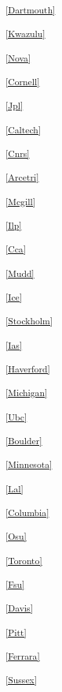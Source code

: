 \begin{multicols}{2}
\noindent
\textsuperscript{\ref{Dartmouth}}\Dartmouthtext

\noindent
\textsuperscript{\ref{Kwazulu}}\Kwazulutext

\noindent
\textsuperscript{\ref{Nova}}\Novatext

\noindent
\textsuperscript{\ref{Cornell}}\Cornelltext

\noindent
\textsuperscript{\ref{Jpl}}\Jpltext

\noindent
\textsuperscript{\ref{Caltech}}\Caltechtext

\noindent
\textsuperscript{\ref{Cnrs}}\Cnrstext

\noindent
\textsuperscript{\ref{Arcetri}}\Arcetritext

\noindent
\textsuperscript{\ref{Mcgill}}\Mcgilltext

\noindent
\textsuperscript{\ref{Ilp}}\Ilptext

\noindent
\textsuperscript{\ref{Cca}}\Ccatext

\noindent
\textsuperscript{\ref{Mudd}}\Muddtext

\noindent
\textsuperscript{\ref{Ice}}\Icetext

\noindent
\textsuperscript{\ref{Stockholm}}\Stockholmtext

\noindent
\textsuperscript{\ref{Ias}}\Iastext

\noindent
\textsuperscript{\ref{Haverford}}\Haverfordtext

\noindent
\textsuperscript{\ref{Michigan}}\Michigantext

\noindent
\textsuperscript{\ref{Ubc}}\Ubctext

\noindent
\textsuperscript{\ref{Boulder}}\Bouldertext

\noindent
\textsuperscript{\ref{Minnesota}}\Minnesotatext

\noindent
\textsuperscript{\ref{Lal}}\Laltext

\noindent
\textsuperscript{\ref{Columbia}}\Columbiatext

\noindent
\textsuperscript{\ref{Osu}}\Osutext

\noindent
\textsuperscript{\ref{Toronto}}\Torontotext

\noindent
\textsuperscript{\ref{Fsu}}\Fsutext

\noindent
\textsuperscript{\ref{Davis}}\Davistext

\noindent
\textsuperscript{\ref{Pitt}}\Pitttext

\noindent
\textsuperscript{\ref{Ferrara}}\Ferraratext

\noindent
\textsuperscript{\ref{Sussex}}\Sussextext


\end{multicols}

